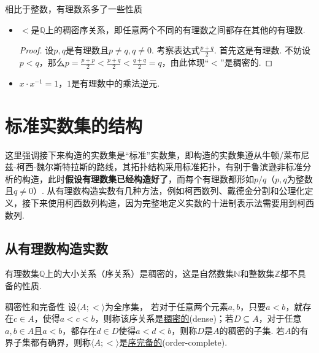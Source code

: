 相比于整数，有理数系多了一些性质
\begin{itemize}
    \item [(1)] \(<\)是\(\mathbb{Q}\)上的稠密序关系，即任意两个不同的有理数之间都存在其他的有理数.
    \begin{proof}
        设\(p,q\)是有理数且\(p\neq q,q \neq 0\). 考察表达式\(\frac{p+q}{2}\). 首先这是有理数. 不妨设\(p<q\)，那么\(p = \frac{p+p}{2} < \frac{p+q}{2} < \frac{q+q}{2} = q\)，由此体现“\(<\)”是稠密的.
    \end{proof}
    \item [(2)] \(x \cdot x^{-1} = 1\)，\(1\)是有理数中的乘法逆元.
\end{itemize}

\section{标准实数集的结构}

这里强调接下来构造的实数集是“标准”实数集，即构造的实数集遵从牛顿/莱布尼兹-柯西-魏尔斯特拉斯的路线，其拓扑结构采用标准拓扑，有别于鲁滨逊非标准分析的构造，此时\textbf{假设有理数集已经构造好了}，而每个有理数都形如\(p/q\)（\(p,q\)为整数且\(q \neq 0\)）. 从有理数构造实数有几种方法，例如柯西数列、戴德金分割和公理化定义，接下来使用柯西数列构造，因为完整地定义实数的十进制表示法需要用到柯西数列.


\subsection{从有理数构造实数}

有理数集\(\mathbb{Q}\)上的大小关系（序关系）是稠密的，这是自然数集\(\mathbb{N}\)和整数集\(\mathbb{Z}\)都不具备的性质.

\begin{definition}{稠密性和完备性}
    设\(\langle A; < \rangle\)为全序集，
    \newline
    若对于任意两个元素\(a,b\)，只要\(a<b\)，就存在\(c \in A\)，使得\(a<c<b\)，则称该序关系是\underline{稠密的}(dense)；若\(D \subseteq A\)，对于任意\(a,b \in A\)且\(a<b\)，都存在\(d \in D\)使得\(a<d<b\)，则称\(D\)是\(A\)的稠密的子集.
    \newline
    若\(A\)的有界子集都有确界，则称\(\langle A; < \rangle\)是\underline{序完备的}(order-complete).
\end{definition}

